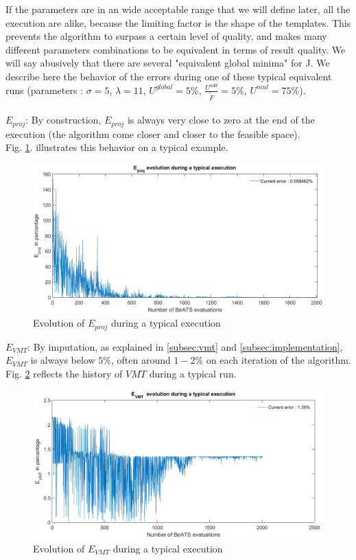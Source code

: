 If the parameters are in an wide acceptable range that we will define later, all the execution are alike, because the limiting factor is the shape of the templates. This prevents the algorithm to surpass a certain level of quality, and makes many different parameters combinations to be equivalent in terms of result quality.
We will say abusively that there are several "equivalent global minima" for J.
We describe here the behavior of the errors during one of these typical equivalent runs (parameters : $\sigma=5$, $\lambda=11$, $U^{global}=5\% $, $\frac{U^{add}}{\widetilde{F}}=5\% $, $U^{mul}=75 \% $).\\
\\
\emph{$E_{proj}$}: By construction, $E_{proj}$ is always very close to zero at the end of the execution (the algorithm come closer and closer to the feasible space).\\
Fig. \ref{fig:eprojexample}. illustrates this behavior on a typical example.\\ 
\begin{figure}[!h]
	\caption{Evolution of $E_{proj}$ during a typical execution}
	\label{fig:eprojexample}
	\includegraphics[width=7in]{figures/results_figures/eprojexample.png}
\end{figure}	
\newpage 
\emph{$E_{VMT}$}: By imputation, as explained in \ref{subsec:vmt} and \ref{subsec:implementation}, $E_{VMT}$ is always below $5\%$, often around $1-2\%$ on each iteration of the algorithm.\\
Fig. \ref{fig:vmtexample} reflects the history of $VMT$ during a typical run.\\
\begin{figure}[!h]
	\caption{Evolution of $E_{VMT}$ during a typical execution}
	\label{fig:vmtexample}
	\includegraphics[width=7in]{figures/results_figures/VMTexample.png}
\end{figure}	
